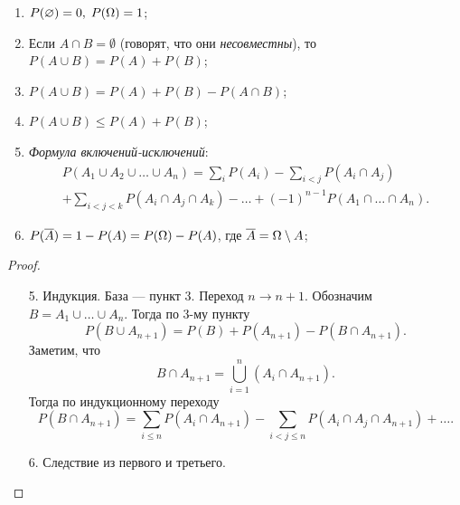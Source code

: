 \begin{properties}[вероятности]
    \begin{enumerate}
        \item $P(\varnothing) = 0, \; P(\Omega) = 1$;
        \item Если $A \cap B = \emptyset$ (говорят, что они \textit{несовместны}), то $P(A \cup B) = P(A) + P(B)$;
        \item $P(A \cup B) = P(A) + P(B) - P(A \cap B)$;
        \item $P(A \cup B) \leq P(A) + P(B)$;
        \item \textit{Формула включений-исключений}:
        \begin{multline*}
             P(A_1\cup A_2 \cup \ldots \cup A_n) = \sum_i{P(A_i)} - \sum_{i<j}P(A_i\cap A_j) \\+ \sum_{i<j<k}P(A_i\cap A_j \cap A_k) - \ldots +(-1)^{n-1}P(A_1\cap\ldots\cap A_n).
        \end{multline*}
    
        \item $P(\overline{A}) = 1 - P(A) = P(\Omega) - P(A)$, где $\overline{A} = \Omega \setminus A$;
    \end{enumerate}
\end{properties}

\begin{proof}
\begin{enumerate}
    \item[5.]Индукция. База --- пункт 3. Переход $n \to n+1$.
   Обозначим $B = A_1 \cup \ldots \cup A_n$. Тогда по 3-му пункту
    $$P(B\cup A_{n+1}) = P(B) +  P(A_{n+1}) - P(B\cap A_{n+1}).$$
   Заметим, что 
   $$B\cap A_{n+1} = \bigcup_{i=1}^n(A_i\cap A_{n+1}).$$
   Тогда по индукционному переходу
   $$P(B\cap A_{n+1}) = \sum_{i\leq n}P(A_i\cap A_{n+1}) - \sum_{i<j\leq n}P(A_i\cap A_j \cap A_{n+1}) + \ldots.$$
   \item[6.] Следствие из первого и третьего. \qedhere
\end{enumerate}
\end{proof}\newpage
